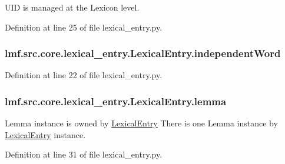 U\+I\+D is managed at the Lexicon level. 



Definition at line 25 of file lexical\+\_\+entry.\+py.

\hypertarget{classlmf_1_1src_1_1core_1_1lexical__entry_1_1_lexical_entry_a6e84227c5c4a0d4d6574f3daa19ebac4}{
\subsubsection[{independent\+Word}]{\setlength{\rightskip}{0pt plus 5cm}lmf.\+src.\+core.\+lexical\+\_\+entry.\+Lexical\+Entry.\+independent\+Word}}\label{classlmf_1_1src_1_1core_1_1lexical__entry_1_1_lexical_entry_a6e84227c5c4a0d4d6574f3daa19ebac4}


Definition at line 22 of file lexical\+\_\+entry.\+py.

\hypertarget{classlmf_1_1src_1_1core_1_1lexical__entry_1_1_lexical_entry_a25e285f1f40cf8c4a17d021c2d2b878f}{
\subsubsection[{lemma}]{\setlength{\rightskip}{0pt plus 5cm}lmf.\+src.\+core.\+lexical\+\_\+entry.\+Lexical\+Entry.\+lemma}}\label{classlmf_1_1src_1_1core_1_1lexical__entry_1_1_lexical_entry_a25e285f1f40cf8c4a17d021c2d2b878f}


Lemma instance is owned by \hyperlink{classlmf_1_1src_1_1core_1_1lexical__entry_1_1_lexical_entry}{Lexical\+Entry} There is one Lemma instance by \hyperlink{classlmf_1_1src_1_1core_1_1lexical__entry_1_1_lexical_entry}{Lexical\+Entry} instance. 



Definition at line 31 of file lexical\+\_\+entry.\+py.

